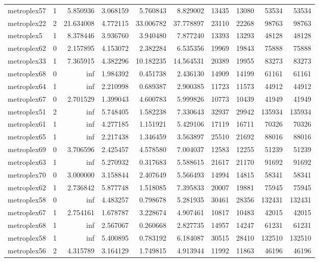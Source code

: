 \begin{longtable}{|l|r|r|r|r|r|r|r|r|r|}
metroplex57 & 1 & 5.850936 & 3.068159 & 5.760843 & 8.829002 & 13435 & 13080 & 53534 & 53534 \\
metroplex22 & 2 & 21.634008 & 4.772115 & 33.006782 & 37.778897 & 23110 & 22268 & 98763 & 98763 \\
metroplex5 & 1 & 8.378446 & 3.936760 & 3.940480 & 7.877240 & 13393 & 13293 & 48128 & 48128 \\
metroplex62 & 0 & 2.157895 & 4.153072 & 2.382284 & 6.535356 & 19969 & 19843 & 75888 & 75888 \\
metroplex33 & 1 & 7.365915 & 4.382296 & 10.182235 & 14.564531 & 20389 & 19955 & 83273 & 83273 \\
metroplex68 & 0 & inf & 1.984392 & 0.451738 & 2.436130 & 14909 & 14199 & 61161 & 61161 \\
metroplex64 & 1 & inf & 2.210998 & 0.689387 & 2.900385 & 11723 & 11573 & 44912 & 44912 \\
metroplex67 & 0 & 2.701529 & 1.399043 & 4.600783 & 5.999826 & 10773 & 10439 & 41949 & 41949 \\
metroplex51 & 2 & inf & 5.748405 & 1.582238 & 7.330643 & 32937 & 29942 & 135934 & 135934 \\
metroplex61 & 1 & inf & 4.277185 & 1.151921 & 5.429106 & 17119 & 16711 & 70326 & 70326 \\
metroplex65 & 1 & inf & 2.217438 & 1.346459 & 3.563897 & 25510 & 21692 & 88016 & 88016 \\
metroplex69 & 0 & 3.706596 & 2.425457 & 4.578580 & 7.004037 & 12583 & 12255 & 51239 & 51239 \\
metroplex63 & 1 & inf & 5.270932 & 0.317683 & 5.588615 & 21617 & 21170 & 91692 & 91692 \\
metroplex70 & 0 & 3.000000 & 3.158844 & 2.407649 & 5.566493 & 14994 & 14815 & 58341 & 58341 \\
metroplex62 & 1 & 2.736842 & 5.877748 & 1.518085 & 7.395833 & 20007 & 19881 & 75945 & 75945 \\
metroplex58 & 0 & inf & 4.483257 & 0.798678 & 5.281935 & 30461 & 28356 & 132431 & 132431 \\
metroplex67 & 1 & 2.754161 & 1.678787 & 3.228674 & 4.907461 & 10817 & 10483 & 42015 & 42015 \\
metroplex68 & 1 & inf & 2.567067 & 0.260668 & 2.827735 & 14957 & 14247 & 61231 & 61231 \\
metroplex58 & 1 & inf & 5.400895 & 0.783192 & 6.184087 & 30515 & 28410 & 132510 & 132510 \\
metroplex56 & 2 & 4.315789 & 3.164129 & 1.749815 & 4.913944 & 11992 & 11863 & 46196 & 46196 \\

\end{longtable}
